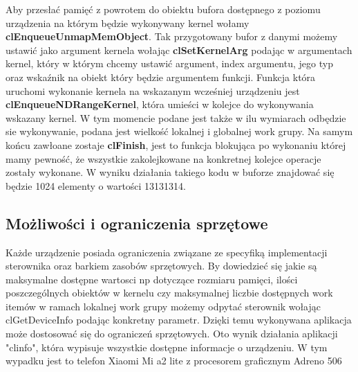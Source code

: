 Aby przesłać pamięć z powrotem do obiektu bufora dostępnego z poziomu urządzenia na którym będzie wykonywany kernel wołamy \textbf{clEnqueueUnmapMemObject}.
Tak przygotowany bufor z danymi możemy ustawić jako argument kernela wołając \textbf{clSetKernelArg} podając w argumentach kernel, który w którym chcemy ustawić argument, index argumentu, jego typ oraz wskaźnik na obiekt który będzie argumentem funkcji.
Funkcja która uruchomi wykonanie kernela na wskazanym wcześniej urządzeniu jest \textbf{clEnqueueNDRangeKernel}, która umieści w kolejce do wykonywania wskazany kernel. W tym momencie podane jest także w ilu wymiarach odbędzie sie wykonywanie, podana jest wielkość lokalnej i globalnej work grupy.
Na samym końcu zawłoane zostaje \textbf{clFinish}, jest to funkcja blokująca po wykonaniu której mamy pewność, że wszystkie zakolejkowane na konkretnej kolejce operacje zostały wykonane.
W wyniku działania takiego kodu w buforze znajdować się będzie 1024 elementy o wartości 13131314.
\subsection{Możliwości i ograniczenia sprzętowe}
Każde urządzenie posiada ograniczenia związane ze specyfiką implementacji sterownika oraz barkiem zasobów sprzętowych. By dowiedzieć się jakie są maksymalne dostępne wartosci np dotyczące rozmiaru pamięci, ilości poszczególnych obiektów w kernelu czy maksymalnej liczbie dostępnych work itemów w ramach lokalnej work grupy możemy odpytać sterownik wołając clGetDeviceInfo podając konkretny parametr. Dzięki temu wykonywana aplikacja może dostosować się do ograniczeń sprzętowych. Oto wynik działania aplikacji "clinfo", która wypisuje wszystkie dostępne informacje o urządzeniu. W tym wypadku jest to telefon Xiaomi Mi a2 lite z procesorem graficznym Adreno 506
 
